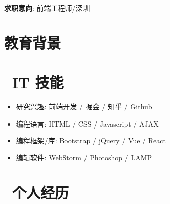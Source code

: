 \documentclass{resume}
\begin{document}


\textbf{求职意向}: 前端工程师/深圳
\section{\faGraduationCap 教育背景}

%

%

\section{\faCogs\ IT 技能}
\begin{itemize}[parsep=0.5ex]
  \item 研究兴趣: 前端开发 / 掘金 / 知乎 / Github
  \item 编程语言: HTML / CSS  / Javascript / AJAX
  \item 编程框架/库: Bootstrap / jQuery /  Vue / React
  \item 编辑软件: WebStorm / Photoshop /  LAMP
\end{itemize}


\section{\faUsers\ 个人经历}
\end{document}
